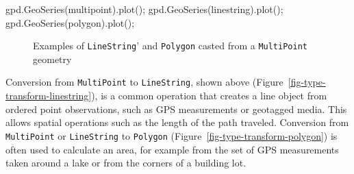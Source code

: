 \documentclass[
  letterpaper,
]{krantz}
\newenvironment{Shaded}{\begin{snugshade}}{\end{snugshade}}
\newcommand{\NormalTok}[1]{\textcolor[rgb]{0.00,0.23,0.31}{#1}}
\newcommand{\OperatorTok}[1]{\textcolor[rgb]{0.37,0.37,0.37}{#1}}
\begin{document}
\begin{Shaded}
\begin{Highlighting}[]
\NormalTok{gpd.GeoSeries(multipoint).plot()}\OperatorTok{;}
\NormalTok{gpd.GeoSeries(linestring).plot()}\OperatorTok{;}
\NormalTok{gpd.GeoSeries(polygon).plot()}\OperatorTok{;}
\end{Highlighting}
\end{Shaded}

\begin{figure}

\begin{minipage}{0.33\linewidth}



\end{minipage}%
%
\begin{minipage}{0.33\linewidth}



\end{minipage}%
%
\begin{minipage}{0.33\linewidth}



\end{minipage}%

\caption{\label{fig-casting1}Examples of
\texttt{\textquotesingle{}LineString}' and
\texttt{\textquotesingle{}Polygon\textquotesingle{}} casted from a
\texttt{\textquotesingle{}MultiPoint\textquotesingle{}} geometry}

\end{figure}%

Conversion from \texttt{\textquotesingle{}MultiPoint\textquotesingle{}}
to \texttt{\textquotesingle{}LineString\textquotesingle{}}, shown above
(Figure~\ref{fig-type-transform-linestring}), is a common operation that
creates a line object from ordered point observations, such as GPS
measurements or geotagged media. This allows spatial operations such as
the length of the path traveled. Conversion from
\texttt{\textquotesingle{}MultiPoint\textquotesingle{}} or
\texttt{\textquotesingle{}LineString\textquotesingle{}} to
\texttt{\textquotesingle{}Polygon\textquotesingle{}}
(Figure~\ref{fig-type-transform-polygon}) is often used to calculate an
area, for example from the set of GPS measurements taken around a lake
or from the corners of a building lot.
\end{document}
